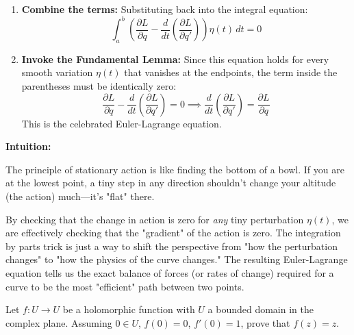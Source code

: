 \begin{solution}
\begin{enumerate}
    \item \textbf{Combine the terms:} Substituting back into the integral equation:
    \[ \int_a^b \left( \frac{\partial L}{\partial q} - \frac{d}{dt} \left( \frac{\partial L}{\partial q'} \right) \right) \eta(t) \, dt = 0 \]

    \item \textbf{Invoke the Fundamental Lemma:} Since this equation holds for every smooth variation $\eta(t)$ that vanishes at the endpoints, the term inside the parentheses must be identically zero:
    \[ \frac{\partial L}{\partial q} - \frac{d}{dt} \left( \frac{\partial L}{\partial q'} \right) = 0 \implies \frac{d}{dt} \left( \frac{\partial L}{\partial q'} \right) = \frac{\partial L}{\partial q} \]
    This is the celebrated Euler-Lagrange equation.
\end{enumerate}
\par\medskip
\textbf{Intuition:}
\par\medskip
The principle of stationary action is like finding the bottom of a bowl. If you are at the lowest point, a tiny step in any direction shouldn't change your altitude (the action) much—it's "flat" there. 
\par\medskip
By checking that the change in action is zero for \textit{any} tiny perturbation $\eta(t)$, we are effectively checking that the "gradient" of the action is zero. The integration by parts trick is just a way to shift the perspective from "how the perturbation changes" to "how the physics of the curve changes." The resulting Euler-Lagrange equation tells us the exact balance of forces (or rates of change) required for a curve to be the most "efficient" path between two points.
\end{solution}

\begin{exercise}
\label{analysis:2015:10}
Let $f:U\to U$ be a holomorphic function with $U$ a bounded domain in the complex plane. Assuming $0\in U$, $f(0)=0$, $f'(0)=1$, prove that $f(z)=z$.
\end{exercise}

